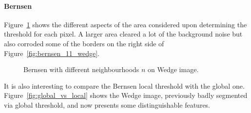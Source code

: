 \documentclass[conference]{IEEEtran}
\begin{document}
\paragraph*{Bernsen} Figure~\ref{fig:bernsen_n} shows the different aspects of the area considered upon determining the threshold for each pixel. A larger area cleared a lot of the background noise but also corroded some of the borders on the right side of Figure~\ref{fig:bernsen_11_wedge}.
\begin{figure}[htbp]
	\centering
	\quad
	\caption{Bernsen with different neighbourhoods $n$ on Wedge image.}
	\label{fig:bernsen_n}
\end{figure}
It is also interesting to compare the Bernsen local threshold with the global one. Figure~\ref{fig:global_vs_local} shows the Wedge image, previously badly segmented via global threshold, and now presents some distinguishable features.
\end{document}
